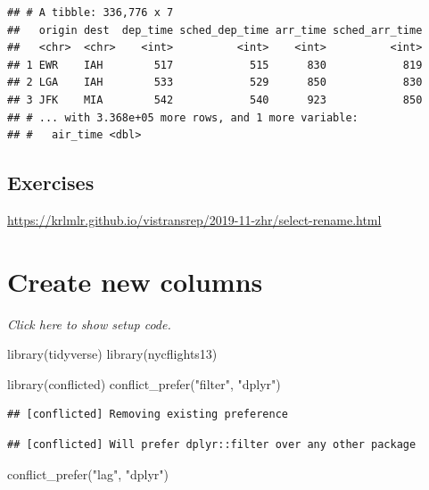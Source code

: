 \documentclass[]{book}
\newenvironment{Shaded}{}{}
\newcommand{\KeywordTok}[1]{\textcolor[rgb]{0.00,0.00,1.00}{#1}}
\newcommand{\NormalTok}[1]{#1}
\newcommand{\StringTok}[1]{\textcolor[rgb]{0.00,0.50,0.50}{#1}}
\begin{document}
\begin{verbatim}
## # A tibble: 336,776 x 7
##   origin dest  dep_time sched_dep_time arr_time sched_arr_time
##   <chr>  <chr>    <int>          <int>    <int>          <int>
## 1 EWR    IAH        517            515      830            819
## 2 LGA    IAH        533            529      850            830
## 3 JFK    MIA        542            540      923            850
## # ... with 3.368e+05 more rows, and 1 more variable:
## #   air_time <dbl>
\end{verbatim}

\hypertarget{exercises-3}{%
\subsection*{Exercises}\label{exercises-3}}

\url{https://krlmlr.github.io/vistransrep/2019-11-zhr/select-rename.html}

\hypertarget{create-new-columns}{%
\section{Create new columns}\label{create-new-columns}}

\emph{Click here to show setup code.}

\begin{Shaded}
\begin{Highlighting}[]
\KeywordTok{library}\NormalTok{(tidyverse)}
\KeywordTok{library}\NormalTok{(nycflights13)}

\KeywordTok{library}\NormalTok{(conflicted)}
\KeywordTok{conflict_prefer}\NormalTok{(}\StringTok{"filter"}\NormalTok{, }\StringTok{"dplyr"}\NormalTok{)}
\end{Highlighting}
\end{Shaded}

\begin{verbatim}
## [conflicted] Removing existing preference
\end{verbatim}

\begin{verbatim}
## [conflicted] Will prefer dplyr::filter over any other package
\end{verbatim}

\begin{Shaded}
\begin{Highlighting}[]
\KeywordTok{conflict_prefer}\NormalTok{(}\StringTok{"lag"}\NormalTok{, }\StringTok{"dplyr"}\NormalTok{)}
\end{Highlighting}
\end{Shaded}
\end{document}

